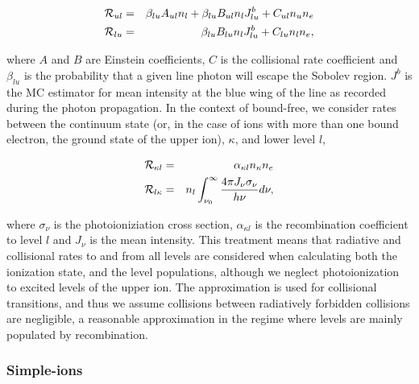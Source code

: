 \documentclass[preprint, a4paper, 11pt]{aastex}
\begin{document}
\begin{eqnarray}
{\cal R}_{ul} &= & \beta_{lu} A_{ul} n_l + \beta_{lu} B_{ul} n_l J_{lu}^b + C_{ul} n_u n_e\label{eq:nlte_rul}\\
{\cal R}_{lu} &= & \beta_{lu} B_{lu} n_l J_{lu}^b + C_{lu} n_l n_e,
\end{eqnarray}


where $A$ and $B$ are Einstein coefficients, $C$ is the collisional rate coefficient and
$\beta_{lu}$ is the probability that a given line photon will escape the Sobolev
region. $J^b$ is the MC estimator for mean intensity at the blue wing of the line as 
recorded during the photon propagation. In the context of 
bound-free, we consider rates between the continuum state (or, in the case of ions with more than one 
bound electron, the ground state of the upper ion), $\kappa$,
and lower level $l$,

\begin{eqnarray}
{\cal R}_{\kappa l} &= & \alpha_{\kappa l} n_{\kappa} n_e \\
{\cal R}_{l \kappa} &= & n_l \int_{\nu_0}^{\infty} \frac{ 4 \pi J_{\nu} \sigma_{\nu}}{h \nu} d\nu,
\end{eqnarray}

where $\sigma_{\nu}$ is the photoioniziation cross section, $\alpha_{\kappa l}$ is the recombination
coefficient to level $l$ and $J_{\nu}$ is the mean intensity.
This treatment means that radiative and collisional rates to and from all 
levels are considered when calculating both the ionization state, and the level populations, 
although we neglect photoionization to excited levels of the upper ion. 
The \cite{vanregemorter} approximation is used for collisional transitions,
and thus we assume collisions between radiatively forbidden collisions are
negligible, a reasonable approximation in the regime where levels are mainly populated
by recombination. 

\subsubsection{Simple-ions}
\end{document}
